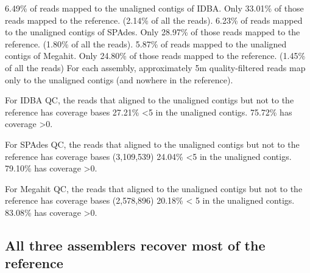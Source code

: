 \documentclass[10pt,a4paper,twocolumn]{article}
\begin{document}
6.49\% of reads mapped to the unaligned contigs of IDBA. Only 33.01\%
of those reads mapped to the reference. (2.14\% of all the reads).
6.23\% of reads mapped to the unaligned contigs of SPAdes. Only
28.97\% of those reads mapped to the reference. (1.80\% of all the
reads).  5.87\% of reads mapped to the unaligned contigs of
Megahit. Only 24.80\% of those reads mapped to the reference. (1.45\%
of all the reads)
For
each assembly, approximately 5m quality-filtered reads map only to the
unaligned contigs (and nowhere in the reference).

 

For IDBA QC, the reads that aligned to the unaligned contigs but not
to the reference has coverage bases 27.21\% \textless 5 in the
unaligned contigs. 75.72\% has coverage \textgreater 0.

For SPAdes QC, the reads that aligned to the unaligned contigs but not
to the reference has coverage bases (3,109,539) 24.04\% \textless 5 in
the unaligned contigs. 79.10\% has coverage \textgreater 0.

For Megahit QC, the reads that aligned to the unaligned contigs but
not to the reference has coverage bases (2,578,896) 20.18\% \textless
5 in the unaligned contigs. 83.08\% has coverage \textgreater 0.

 

\subsection*{All three assemblers recover most of the reference}

\end{document}
